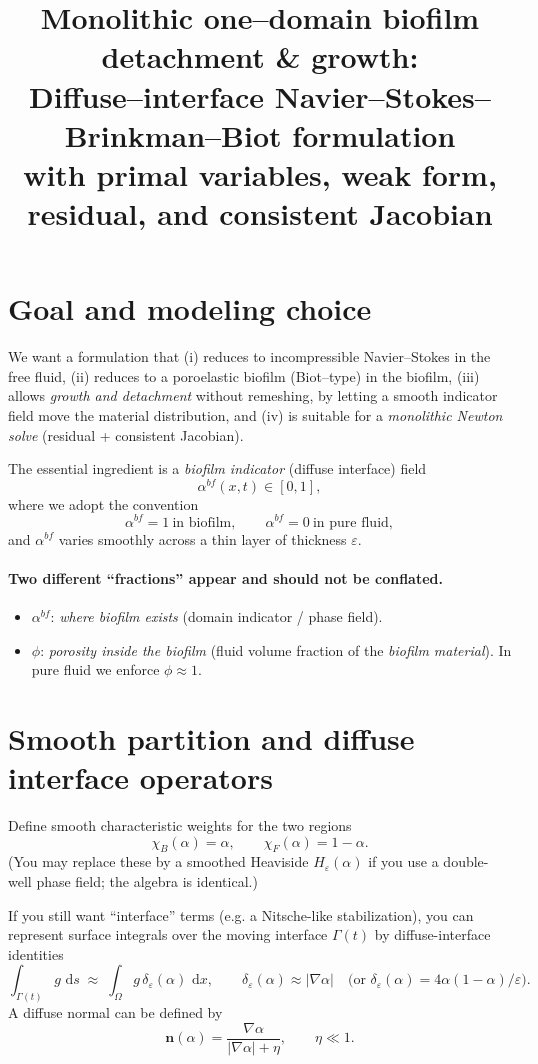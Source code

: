 \documentclass[11pt]{article}
\title{Monolithic one--domain biofilm detachment \& growth:\\
Diffuse--interface Navier--Stokes--Brinkman--Biot formulation\\
with primal variables, weak form, residual, and consistent Jacobian}
\author{}
\date{}
\newcommand{\dd}{\,\mathrm{d}}
\newcommand{\n}{\bm{n}}
\newcommand{\grad}{\nabla}
\newcommand{\Hs}{H_\varepsilon}
\newcommand{\ds}{\delta_\varepsilon}
\begin{document}
\maketitle

\section{Goal and modeling choice}

We want a formulation that
(i) reduces to incompressible Navier--Stokes in the free fluid,
(ii) reduces to a poroelastic biofilm (Biot--type) in the biofilm,
(iii) allows \emph{growth and detachment} without remeshing, by letting a smooth indicator field move the material distribution,
and (iv) is suitable for a \emph{monolithic Newton solve} (residual + consistent Jacobian).

The essential ingredient is a \emph{biofilm indicator} (diffuse interface) field
\[
\alpha^{bf}(x,t)\in[0,1],
\]
where we adopt the convention
\[
\alpha^{bf}=1\ \text{in biofilm},\qquad \alpha^{bf}=0\ \text{in pure fluid},
\]
and $\alpha^{bf}$ varies smoothly across a thin layer of thickness $\varepsilon$.

\paragraph{Two different ``fractions'' appear and should not be conflated.}
\begin{itemize}
\item $\alpha^{bf}$: \emph{where biofilm exists} (domain indicator / phase field).
\item $\phi$: \emph{porosity inside the biofilm} (fluid volume fraction of the \emph{biofilm material}).
In pure fluid we enforce $\phi\approx 1$.
\end{itemize}

\section{Smooth partition and diffuse interface operators}

Define smooth characteristic weights for the two regions
\[
\chi_B(\alpha)=\alpha,\qquad \chi_F(\alpha)=1-\alpha.
\]
(You may replace these by a smoothed Heaviside $\Hs(\alpha)$ if you use a double-well phase field; the algebra is identical.)

If you still want ``interface'' terms (e.g. a Nitsche-like stabilization),
you can represent surface integrals over the moving interface $\Gamma(t)$ by diffuse-interface identities
\[
\int_{\Gamma(t)} g\,\dd s \;\approx\; \int_{\Omega} g \,\ds(\alpha)\,\dd x,
\qquad
\ds(\alpha)\approx |\grad \alpha| \quad \text{(or } \ds(\alpha)=4\alpha(1-\alpha)/\varepsilon\text{)}.
\]
A diffuse normal can be defined by
\[
\n(\alpha)=\frac{\grad\alpha}{|\grad\alpha|+\eta},\qquad \eta\ll 1.
\]
\end{document}
